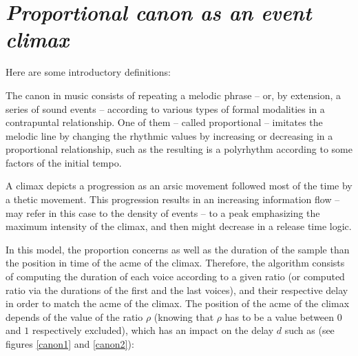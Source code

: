 
\section{\textsl{Proportional canon as an event climax}}

\label{imp2}

Here are some introductory definitions:

\smallskip

{The canon in music consists of repeating a melodic phrase -- or, by extension, a series of sound events -- according to various types of formal modalities in a contrapuntal relationship. One of them -- called proportional -- imitates the melodic line by changing the rhythmic values by increasing or decreasing in a proportional relationship, such as the resulting is a polyrhythm according to some factors of the initial tempo.}

{A climax depicts a progression as an arsic movement followed most of the time by a thetic movement. This progression results in an increasing information flow -- may refer in this case to the density of events -- to a peak emphasizing the maximum intensity of the climax, and then might decrease in a release time logic.}
  
  \bigskip
  
  In this model, the proportion concerns as well as the duration of the sample than the position in time of the acme of the climax.  Therefore, the algorithm consists of computing the duration of each voice according to a given ratio (or computed ratio via the durations of the first and the last voices), and their respective delay in order to match the acme of the climax.
  The position of the acme of the climax depends of the value of the ratio $\rho$ (knowing that $\rho$ has to be a value between $0$ and $1$ respectively excluded), which has an impact on the delay $d$ such as (see figures \ref{canon1} and \ref{canon2}):
  
